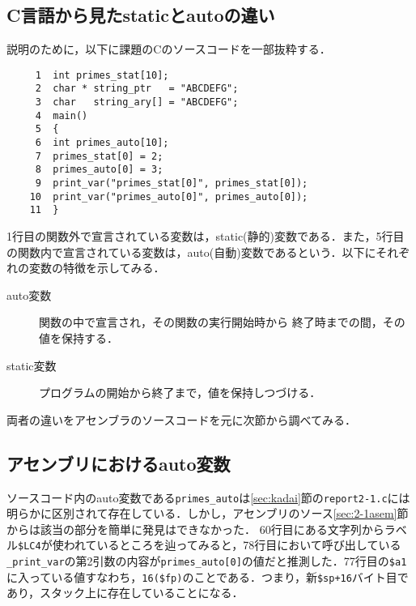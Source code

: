 \documentclass[a4j,11pt]{jarticle}
\begin{document}
  \subsection{C言語から見たstaticとautoの違い}
説明のために，以下に課題のCのソースコードを一部抜粋する．
\begin{verbatim}
     1	int primes_stat[10]; 
     2	char * string_ptr   = "ABCDEFG";
     3	char   string_ary[] = "ABCDEFG";
     4	main()
     5	{
     6	int primes_auto[10];
     7	primes_stat[0] = 2;
     8	primes_auto[0] = 3;
     9	print_var("primes_stat[0]", primes_stat[0]);
    10	print_var("primes_auto[0]", primes_auto[0]);
    11	}
\end{verbatim}
1行目の関数外で宣言されている変数は，static(静的)変数である．また，5行目の関数内で宣言されている変数は，auto(自動)変数であるという．以下にそれぞれの変数の特徴を示してみる．
\begin{description}
\item[auto変数]関数の中で宣言され，その関数の実行開始時から 終了時までの間，その値を保持する．
\item[static変数]プログラムの開始から終了まで，値を保持しつづける．
\end{description}
両者の違いをアセンブラのソースコードを元に次節から調べてみる．
\subsection{アセンブリにおけるauto変数}
ソースコード内のauto変数である\verb|primes_auto|は\ref{sec:kadai}節の\verb|report2-1.c|には明らかに区別されて存在している．しかし，アセンブリのソース\ref{sec:2-1asem}節からは該当の部分を簡単に発見はできなかった．
60行目にある文字列からラベル\verb|$LC4|が使われているところを辿ってみると，78行目において呼び出している\verb|_print_var|の第2引数の内容が\verb|primes_auto[0]|の値だと推測した．77行目の\verb|$a1|に入っている値すなわち，\verb|16($fp)|のことである．つまり，新\verb|$sp+16|バイト目であり，スタック上に存在していることになる．
\end{document}
